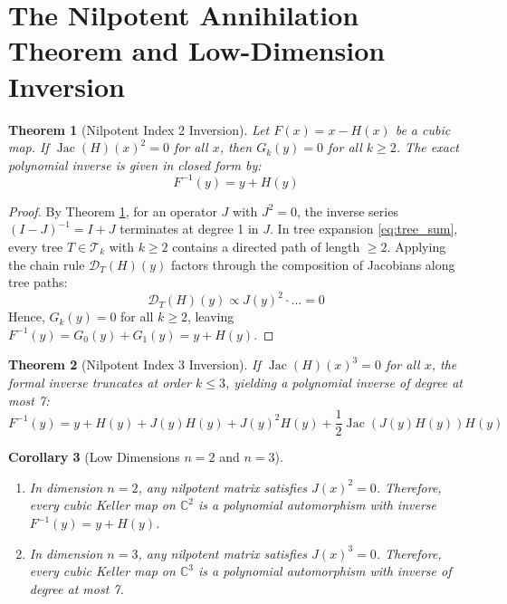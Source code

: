 \documentclass[11pt,a4paper]{article}
\newtheorem{theorem}{Theorem}[section]
\newtheorem{corollary}[theorem]{Corollary}
\theoremstyle{definition}
\begin{document}
\section{The Nilpotent Annihilation Theorem and Low-Dimension Inversion}

\begin{theorem}[Nilpotent Index 2 Inversion]\label{thm:nilpotent_2}
Let $F(x) = x - H(x)$ be a cubic map. If $\operatorname{Jac}(H)(x)^2 = 0$ for all $x$, then $G_k(y) = 0$ for all $k \ge 2$.
The exact polynomial inverse is given in closed form by:
\begin{equation}\label{eq:exact_inv_2}
F^{-1}(y) = y + H(y)
\end{equation}
\end{theorem}

\begin{proof}
By Theorem \ref{thm:nilpotent_2}, for an operator $J$ with $J^2 = 0$, the inverse series $(I - J)^{-1} = I + J$ terminates at degree 1 in $J$.
In tree expansion \eqref{eq:tree_sum}, every tree $T \in \mathcal{T}_k$ with $k \ge 2$ contains a directed path of length $\ge 2$.
Applying the chain rule $\mathcal{D}_T(H)(y)$ factors through the composition of Jacobians along tree paths:
\[ \mathcal{D}_T(H)(y) \propto J(y)^2 \cdot \dots = 0 \]
Hence, $G_k(y) = 0$ for all $k \ge 2$, leaving $F^{-1}(y) = G_0(y) + G_1(y) = y + H(y)$.
\end{proof}

\begin{theorem}[Nilpotent Index 3 Inversion]\label{thm:nilpotent_3}
If $\operatorname{Jac}(H)(x)^3 = 0$ for all $x$, the formal inverse truncates at order $k \le 3$, yielding a polynomial inverse of degree at most 7:
\begin{equation}\label{eq:exact_inv_3}
F^{-1}(y) = y + H(y) + J(y) H(y) + J(y)^2 H(y) + \frac{1}{2} \operatorname{Jac}(J(y)H(y)) H(y)
\end{equation}
\end{theorem}

\begin{corollary}[Low Dimensions $n = 2$ and $n = 3$]\label{cor:low_dim}
\begin{enumerate}
    \item In dimension $n = 2$, any nilpotent matrix satisfies $J(x)^2 = 0$. Therefore, every cubic Keller map on $\mathbb{C}^2$ is a polynomial automorphism with inverse $F^{-1}(y) = y + H(y)$.
    \item In dimension $n = 3$, any nilpotent matrix satisfies $J(x)^3 = 0$. Therefore, every cubic Keller map on $\mathbb{C}^3$ is a polynomial automorphism with inverse of degree at most 7.
\end{enumerate}
\end{corollary}
\end{document}
